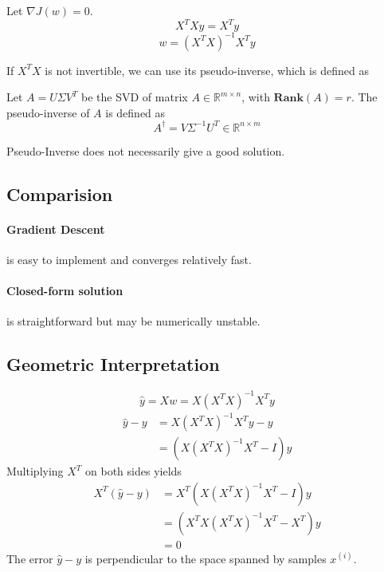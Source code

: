 Let $\nabla J(w) = 0$.
\[ X^TXy = X^Ty \]
\[ w = (X^TX)^{-1}X^Ty \]
\begin{remark}
    If $X^TX$ is not invertible, we can use its pseudo-inverse, which is defined as
\end{remark}
\begin{definition}
    Let $A = U\Sigma V^T$ be the SVD of matrix $A \in \mathbb{R}^{m\times n}$, with $\mathbf{Rank}(A) = r$. The pseudo-inverse of $A$ is defined as
    \[ A^{\dagger} = V\Sigma^{-1}U^T \in \mathbb{R}^{n\times m} \]
\end{definition}
\begin{remark}
    Pseudo-Inverse does not necessarily give a good solution.
\end{remark}
\subsection{Comparision}
\paragraph{Gradient Descent} is easy to implement and converges relatively fast.
\paragraph{Closed-form solution} is straightforward but may be numerically unstable.
\subsection{Geometric Interpretation}
\[ \hat{y} = Xw = X(X^TX)^{-1}X^Ty \]
\begin{align*}
    \hat{y} - y &= X(X^TX)^{-1}X^Ty - y \\
    &= (X(X^TX)^{-1}X^T - I)y
\end{align*}
Multiplying $X^T$ on both sides yields
\begin{align*}
    X^T(\hat{y}-y) &= X^T(X(X^TX)^{-1}X^T - I)y \\
    &= (X^TX(X^TX)^{-1}X^T - X^T)y \\
    &= 0
\end{align*}
The error $\hat{y} - y$ is perpendicular to the space spanned by samples $x^{(i)}$.
